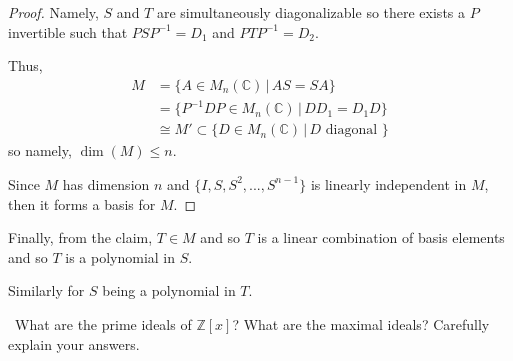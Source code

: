 \documentclass[12pt]{Qual}
\begin{document}
\begin{solution}
\begin{claim}
\begin{proof}
Namely, $S$ and $T$ are simultaneously diagonalizable so there exists a $P$ invertible such that $PSP^{-1}=D_1$ and $PTP^{-1}=D_2$.

Thus, \begin{align*}
    M&=\{A\in M_n(\mathbb{C})\,|\, AS=SA\}\\
    &=\{P^{-1}DP\in M_n(\mathbb{C})\,|\, DD_1=D_1D\}\\
    &\cong M'\subset\{D\in M_n(\mathbb{C})\,|\, D\text{ diagonal }\}
\end{align*}
so namely, $\dim(M)\le n$.

Since $M$ has dimension $n$ and $\{I,S,S^2,...,S^{n-1}\}$ is linearly independent in $M$, then it forms a basis for $M$.
\end{proof}
\end{claim}

Finally, from the claim, $T\in M$ and so $T$ is a linear combination of basis elements and so $T$ is a polynomial in $S$.

Similarly for $S$ being a polynomial in $T$.
\end{solution}
\newpage




\begin{problem} $\,$
What are the prime ideals of $\mathbb{Z}[x]$? What are the maximal ideals? Carefully explain your answers.
\end{problem}
\end{document}
